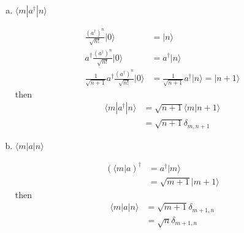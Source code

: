 \documentclass[10pt,a4paper]{book}
\theoremstyle{definition}
\begin{document}
\begin{enumerate}[(a)]
\item $\langle m|a^\dagger|n\rangle$

\begin{align}
\frac{(a^\dagger)^n}{\sqrt{n!}}|0\rangle&=|n\rangle\\
a^\dagger\frac{(a^\dagger)^n}{\sqrt{n!}}|0\rangle&=a^\dagger|n\rangle\\
\frac{1}{\sqrt{n+1}}a^\dagger\frac{(a^\dagger)^n}{\sqrt{n!}}|0\rangle&=\frac{1}{\sqrt{n+1}}a^\dagger|n\rangle=|n+1\rangle
\end{align}
then
\begin{align}
\langle m|a^\dagger|n\rangle
&=\sqrt{n+1}\langle m|n+1\rangle\\
&=\sqrt{n+1}\delta_{m,n+1}
\end{align}

\item $\langle m|a|n\rangle$

\begin{align}
(\langle m|a)^\dagger
&=a^\dagger|m\rangle\\
&=\sqrt{m+1}|m+1\rangle
\end{align}
then
\begin{align}
\langle m|a|n\rangle
&=\sqrt{m+1}\delta_{m+1,n}\\
&=\sqrt{n}\delta_{m+1,n}
\end{align}
\end{enumerate}
\end{document}
